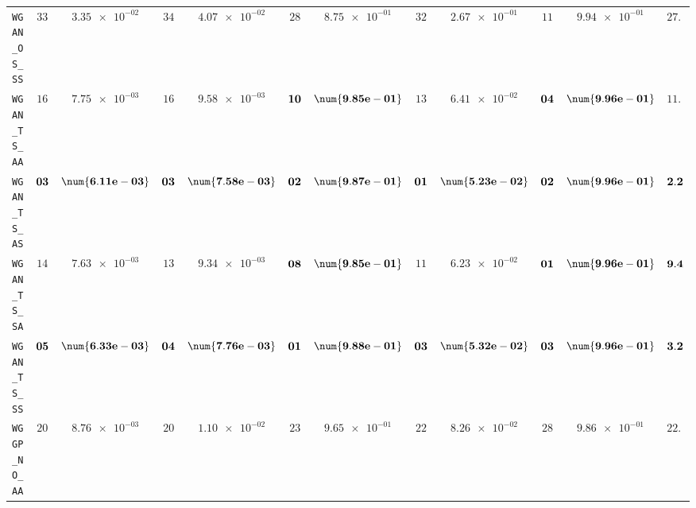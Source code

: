 \begin{xltabular}{\textwidth}{l||cC|cC|cC|cC|cC||c}
	\texttt{WGAN\_OS\_SS} & $ 33$ & $ \num{3.35e-02}$ & $ 34$ & $ \num{4.07e-02}$ & $ 28$ & $ \num{8.75e-01}$ & $ 32$ & $ \num{2.67e-01}$ & $ 11$ & $ \num{9.94e-01}$ & $ 27.6$  \\
	\texttt{WGAN\_TS\_AA} & $ 16$ & $ \num{7.75e-03}$ & $ 16$ & $ \num{9.58e-03}$ & $\bf 10$ & $\bf \num{9.85e-01}$ & $ 13$ & $ \num{6.41e-02}$ & $\bf 04$ & $\bf \num{9.96e-01}$ & $ 11.8$  \\
	\texttt{WGAN\_TS\_AS} & $\bf 03$ & $\bf \num{6.11e-03}$ & $\bf 03$ & $\bf \num{7.58e-03}$ & $\bf 02$ & $\bf \num{9.87e-01}$ & $\bf 01$ & $\bf \num{5.23e-02}$ & $\bf 02$ & $\bf \num{9.96e-01}$ & $\bf 2.2$  \\
	\texttt{WGAN\_TS\_SA} & $ 14$ & $ \num{7.63e-03}$ & $ 13$ & $ \num{9.34e-03}$ & $\bf 08$ & $\bf \num{9.85e-01}$ & $ 11$ & $ \num{6.23e-02}$ & $\bf 01$ & $\bf \num{9.96e-01}$ & $\bf 9.4$  \\
	\texttt{WGAN\_TS\_SS} & $\bf 05$ & $\bf \num{6.33e-03}$ & $\bf 04$ & $\bf \num{7.76e-03}$ & $\bf 01$ & $\bf \num{9.88e-01}$ & $\bf 03$ & $\bf \num{5.32e-02}$ & $\bf 03$ & $\bf \num{9.96e-01}$ & $\bf 3.2$  \\ \midrule
	\texttt{WGGP\_NO\_AA} & $ 20$ & $ \num{8.76e-03}$ & $ 20$ & $ \num{1.10e-02}$ & $ 23$ & $ \num{9.65e-01}$ & $ 22$ & $ \num{8.26e-02}$ & $ 28$ & $ \num{9.86e-01}$ & $ 22.6$  \\

\end{xltabular}
